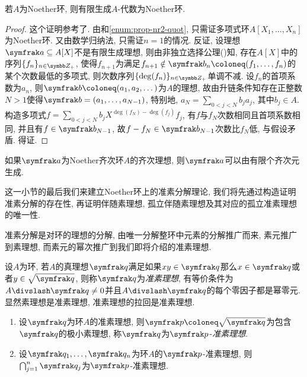 \begin{theorem}\label{thm:hilbertbasis}
  若$A$为Noether环, 则有限生成$A$-代数为Noether环.
\end{theorem}

\begin{proof}
  这个证明参考了. 由和\ref{enum:prop-nr2-quot}, 只需证多项式环$A[X_1, \dotsc, X_n]$为Noether环. 又由数学归纳法, 只需证$n=1$的情况. 反证, 设理想$\ideal{a}\subseteq A[X]$不是有限生成理想, 则由非独立选择公理()知, 存在$A[X]$中的序列$\{f_n\}_{n\in\ZZ_+}$, 使得$f_{n+1}$为满足$f_{n+1}\notin \ideal{b}_n\coloneq (f_1, \dotsc, f_{n})$的某个次数最低的多项式, 则次数序列$\{\deg(f_n)\}_{n\in\ZZ_+}$单调不减. 设$f_n$的首项系数为$a_n$, 则$\ideal{b}\coloneq (a_1, a_2, \dotsc)$为$A$的理想, 故由升链条件知存在正整数$N>1$使得$\ideal{b}=(a_1, \dotsc, a_{N-1})$, 特别地, $a_N=\sum_{0<j<N}b_ja_j$, 其中$b_j\in A$. 构造多项式$f=\sum_{0<j<N}b_jX^{\deg(f_N)-\deg(f_j)}f_j$, 有$f$与$f_N$次数相同且首项系数相同, 并且有$f\in\ideal{b}_{N-1}$, 故$f-f_N\in\ideal{b}_{N-1}$次数比$f_N$低, 与假设矛盾. 得证.
\end{proof}

\begin{propositionnoproof}
  如果$\ideal{a}$为Noether齐次环$A$的齐次理想, 则$\ideal{a}$可以由有限个齐次元生成.
\end{propositionnoproof}

这一小节的最后我们来建立Noether环上的准素分解理论, 我们将先通过构造证明准素分解的存在性, 再证明伴随素理想, 孤立伴随素理想及其对应的孤立准素理想的唯一性.

准素分解是对环的理想的分解, 由唯一分解整环中元素的分解推广而来, 素元推广到素理想, 而素元的幂次推广到我们即将介绍的准素理想.

\begin{definition}
  设$A$为环, 若$A$的真理想$\ideal{q}$满足如果$xy\in \ideal{q}$那么$x\in\ideal{q}$或者$y\in\sqrt{\ideal{q}}$, 则称$\ideal{q}$为\emph{准素理想}, 有等价条件为$A{\divslash}\ideal{q}\neq 0$并且$A{\divslash}\ideal{q}$的每个零因子都是幂零元. 显然素理想是准素理想, 准素理想的拉回是准素理想.
\end{definition}

\begin{propositionnoproof}\label{prop:primary}\leavevmode
  \begin{enumerate}
    \item 设$\ideal{q}$为环$A$的准素理想, 则$\ideal{p}\coloneq \sqrt{\ideal{q}}$为包含$\ideal{q}$的极小素理想, 称$\ideal{q}$为$\ideal{p}$-\emph{准素理想}.
    \item\label{enum:prim-inte} 设$\ideal{q}_1, \dotsc, \ideal{q}_n$为环$A$的$\ideal{p}$-准素理想, 则$\bigcap_{j=1}^n\ideal{q}_j$为$\ideal{p}$-准素理想.
  \end{enumerate}
\end{propositionnoproof}

